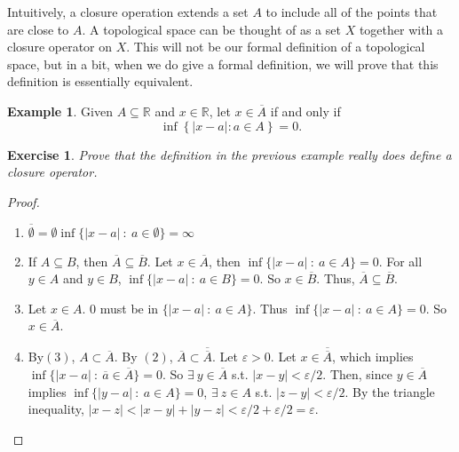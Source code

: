 \documentclass[12pt]{amsart}
\newtheorem{exercise}{Exercise}[section]
\theoremstyle{definition}
\newtheorem{example}[theorem]{Example}
\theoremstyle{remark}
\newcommand{\R}{\mathbb{R}}
\newcommand{\explicitSet}[1]{\left\lbrace #1 \right\rbrace}
\newcommand{\set}[2]{\explicitSet{#1 \colon #2}}
\newcommand{\0}{\emptyset}
\newcommand{\closure}[1]{\overline{#1}}
\begin{document}
Intuitively, a closure operation extends a set $A$ to include all of the points that are close to $A$. A topological space can be thought of as a set $X$ together with a closure operator on $X$. This will not be our formal definition of a topological space, but in a bit, when we do give a formal definition, we will prove that this definition is essentially equivalent.

\begin{example}\label{example:realline}
Given $A \subseteq \R$ and $x \in \R$, let $x \in \closure{A}$ if and only if
$$\inf \set{|x-a|}{a \in A} = 0.$$
\end{example}

\begin{exercise}
Prove that the definition in the previous example really does define a closure operator.
\end{exercise}

\begin{proof}
	\begin{enumerate}
	\item 
		$\overline{\emptyset}=\emptyset \inf\{|x-a| \ : \ a\in \emptyset\}=\infty$
	\item 
		If $A\subseteq B$, then $\overline{A}\subseteq \overline{B}$.  Let $x\in \overline{A}$, then $\inf\{|x-a| \ : \ a\in A\}=0$.  For all $y\in A$ and $y\in B$, $\inf\{|x-a| \ : \ a\in B\}=0$.  So $x\in \overline{B}$.  Thus, $\overline{A}\subseteq \overline{B}$.
	\item 
	Let $x\in A$.  $0$ must be in $\{|x-a| \ : \ a\in A\}$.  Thus $\inf \{|x-a| \ : \ a\in A\}=0$. So $x\in \overline{A}$.
	\item
		By$(3)$, $A\subset \overline{A}$.  By $(2)$, $\overline{A} \subset \overline{\overline{A}}$.  Let $\varepsilon>0$.  Let $x\in  \overline{\overline{A}}$, which implies $\inf \{|x-a| \ : \ \overline{a} \in \overline{A} \}=0$.  So $\exists \ y\in \overline{A}$ s.t. $|x-y|<\varepsilon/2$.  Then, since $y\in \overline{A}$ implies $\inf \{|y-a| \ : \ a \in A \}=0$, $\exists \ z \in A$ s.t.  $|z-y|<\varepsilon / 2$.  By the triangle inequality, $|x-z|<|x-y|+|y-z|<\varepsilon/2+\varepsilon/2=\varepsilon$.
	\end{enumerate}
\end{proof}
\end{document}
